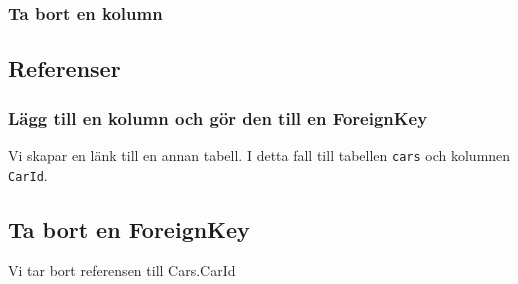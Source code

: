 \hypertarget{ta-bort-en-kolumn}{%
\subsubsection{Ta bort en kolumn}\label{ta-bort-en-kolumn}}

\hypertarget{cb3}{}
\begin{Shaded}
\begin{Highlighting}[]
  
\end{Highlighting}
\end{Shaded}

\hypertarget{referenser}{%
\subsection{Referenser}\label{referenser}}

\hypertarget{luxe4gg-till-en-kolumn-och-guxf6r-den-till-en-foreignkey}{%
\subsubsection{Lägg till en kolumn och gör den till en
ForeignKey}\label{luxe4gg-till-en-kolumn-och-guxf6r-den-till-en-foreignkey}}

Vi skapar en länk till en annan tabell. I detta fall till tabellen
\texttt{cars} och kolumnen \texttt{CarId}.

\hypertarget{cb4}{}
\begin{Shaded}
\begin{Highlighting}[]
  \NormalTok{(}
   
\end{Highlighting}
\end{Shaded}

\hypertarget{ta-bort-en-foreignkey}{%
\subsection{Ta bort en ForeignKey}\label{ta-bort-en-foreignkey}}

Vi tar bort referensen till Cars.CarId

\hypertarget{cb5}{}
\begin{Shaded}
\begin{Highlighting}[]
   
\end{Highlighting}
\end{Shaded}

